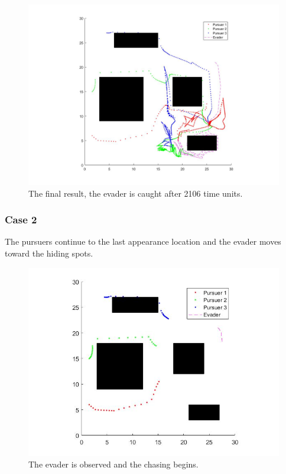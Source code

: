 \documentclass[ebook,11pt] {kth-mag}
\begin{document}
\begin{figure}[H]
\includegraphics[scale=0.4]{c1_fin}
\centering
\caption{The final result, the evader is caught after 2106 time units.}
\end{figure}

\subsubsection{Case 2}
The pursuers continue to the last appearance location and the evader moves toward the hiding spots.

\begin{figure}[H]
\includegraphics[scale=0.4]{close_second}
\centering
\caption{The evader is observed and the chasing begins.}
\end{figure}
\end{document}
